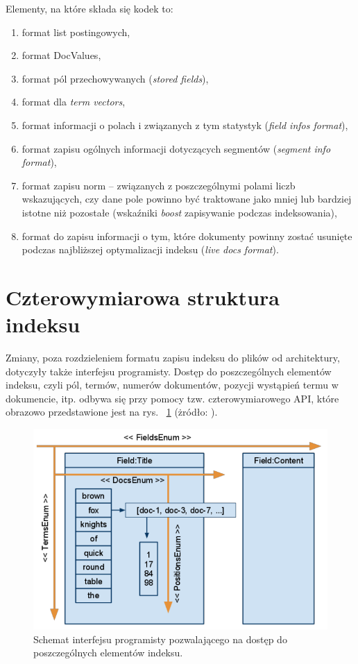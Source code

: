 Elementy, na które składa się kodek to:
\begin{enumerate}
 \item format list postingowych,
 \item format DocValues,
 \item format pól przechowywanych (\emph{stored fields}),
 \item format dla \emph{term vectors},
 \item format informacji o polach i związanych z tym statystyk (\emph{field infos format}),
 \item format zapisu ogólnych informacji dotyczących segmentów (\emph{segment info format}),
 \item format zapisu norm -- związanych z poszczególnymi polami liczb wskazujących, czy dane pole powinno być traktowane jako mniej lub bardziej istotne niż pozostałe (wskaźniki \emph{boost} zapisywanie podczas indeksowania),
 \item format do zapisu informacji o tym, które dokumenty powinny zostać usunięte podczas najbliższej optymalizacji indeksu (\emph{live docs format}).
\end{enumerate}

\section{Czterowymiarowa struktura indeksu}

Zmiany, poza rozdzieleniem formatu zapisu indeksu do plików od architektury, dotyczyły także interfejsu programisty. Dostęp do poszczególnych elementów indeksu, czyli pól, termów, numerów dokumentów, pozycji wystąpień termu w dokumencie, itp. odbywa się przy pomocy tzw. czterowymiarowego API, które obrazowo przedstawione jest na rys. ~\ref{4dimAPI} (żródło: \cite{flexindex}).

\begin{figure}[here]
 \label{4dimAPI}
 \includegraphics[scale=0.5]{api.png}
 \caption{Schemat interfejsu programisty pozwalającego na dostęp do poszczególnych elementów indeksu.}
\end{figure}

